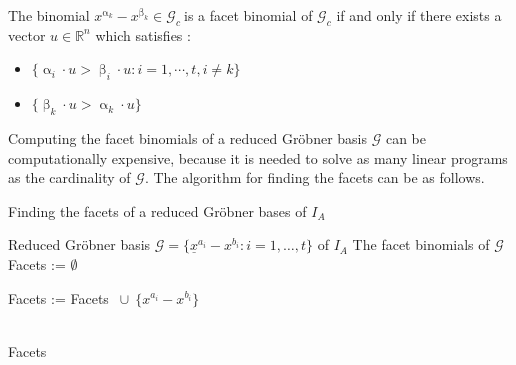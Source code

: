 \begin{env_definition}
\cite{tigers}
The binomial $x^{\upalpha_{k}}-x^{\upbeta_k} \in \mathcal{G}_c~$is a facet binomial of $\mathcal{G}_c$ if and only if there exists a vector $u \in \mathbb{R}^{n}$ which satisfies :

\begin{itemize}
\item
$ \lbrace \upalpha_{i} \cdot u > \upbeta_{i} \cdot u : i = 1, \cdots , t, i \neq k \rbrace  
$
\item
$ \lbrace \upbeta_{k} \cdot u > \upalpha_{k} \cdot u \rbrace $
\end{itemize}


\end{env_definition}
Computing the facet binomials of a reduced Gröbner basis $\mathcal{G}$ can be computationally expensive, because it is needed to solve as many linear programs as the cardinality of $\mathcal{G}$. The algorithm for finding the facets can be as follows.

\label{facets}

\begin{algorithm}
\caption{Finding the facets of a reduced Gröbner bases of $I_A$ \cite{tigers}}
\label{alg:facetsLP}
\begin{algorithmic}[1]

\Input
Reduced Gröbner basis $ \mathcal{G} = \lbrace \underline{x}^{a_{i}} - {x}^{b_{i}} : i = 1,\dots,t  \rbrace $ of $I_A$
\Output The facet binomials of $\mathcal{G}$
\State Facets := $\emptyset$

\State Facets := Facets $~\cup~\{{x}^{a_{i}} - {x}^{b_{i}} \} $
\EndIf

\EndFor \\
\Return Facets
\end{algorithmic}
\end{algorithm}

